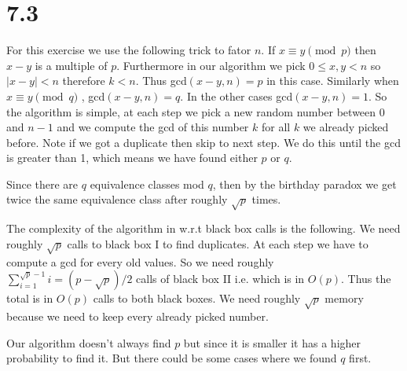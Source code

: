 \documentclass[12pt,a4paper]{article}
\begin{document}
\section*{7.3}
For this exercise we use the following trick to fator $n$. If $x \equiv y \pmod p$ then $x-y$ is a multiple of $p$. Furthermore in our algorithm we pick
$0 \leq x,y < n$ so $|x - y| < n$ therefore $k < n$. Thus gcd$(x-y,n) = p$ in this case. Similarly when $x \equiv y \pmod q$ , gcd$(x-y,n) = q$.
In the other cases gcd$(x-y,n) = 1$.
So the algorithm is simple, at each step we pick a new random number between 0 and $n-1$ and we compute the gcd of this number $k$ for all $k$ we already picked before.
Note if we got a duplicate then skip to next step.
We do this until the gcd is greater than 1, which means we have found either $p$ or $q$. 

Since there are $q$ equivalence classes mod $q$, then by the birthday paradox we get twice the same equivalence class after roughly $\sqrt p$ times.

The complexity of the algorithm in w.r.t black box calls is the following. We need roughly $\sqrt p$ calls to black box I to find duplicates. 
At each step we have to compute a gcd for every old values.
So we need roughly $\sum_{i = 1}^{\sqrt p - 1}i = (p - \sqrt p)/2$ calls of black box II i.e. which is in $O(p)$. Thus the total is in $O(p)$ calls to both black boxes.
We need roughly $\sqrt p$ memory because we need to keep every already picked number.

Our algorithm doesn't always find $p$ but since it is smaller it has a higher probability to find it. But there could be some cases where we found $q$ first.
\end{document}
